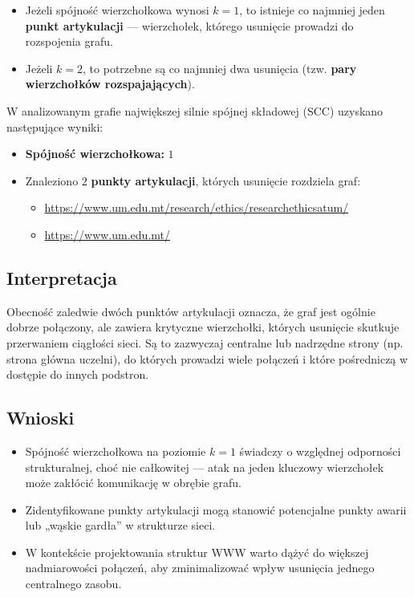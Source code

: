 \begin{itemize}
    \item Jeżeli spójność wierzchołkowa wynosi $k = 1$, to istnieje co najmniej jeden \textbf{punkt artykulacji} — wierzchołek, którego usunięcie prowadzi do rozspojenia grafu.
    \item Jeżeli $k = 2$, to potrzebne są co najmniej dwa usunięcia (tzw. \textbf{pary wierzchołków rozspajających}).
\end{itemize}

W analizowanym grafie największej silnie spójnej składowej (SCC) uzyskano następujące wyniki:

\begin{itemize}
    \item \textbf{Spójność wierzchołkowa:} $1$
    \item Znaleziono $2$ \textbf{punkty artykulacji}, których usunięcie rozdziela graf:
    \begin{itemize}
        \item \url{https://www.um.edu.mt/research/ethics/researchethicsatum/}
        \item \url{https://www.um.edu.mt/}
    \end{itemize}
\end{itemize}

\subsection{Interpretacja}

Obecność zaledwie dwóch punktów artykulacji oznacza, że graf jest ogólnie dobrze połączony, ale zawiera krytyczne wierzchołki, których usunięcie skutkuje przerwaniem ciągłości sieci. Są to zazwyczaj centralne lub nadrzędne strony (np. strona główna uczelni), do których prowadzi wiele połączeń i które pośredniczą w dostępie do innych podstron.

\subsection{Wnioski}

\begin{itemize}
    \item Spójność wierzchołkowa na poziomie $k = 1$ świadczy o względnej odporności strukturalnej, choć nie całkowitej — atak na jeden kluczowy wierzchołek może zakłócić komunikację w obrębie grafu.
    \item Zidentyfikowane punkty artykulacji mogą stanowić potencjalne punkty awarii lub „wąskie gardła” w strukturze sieci.
    \item W kontekście projektowania struktur WWW warto dążyć do większej nadmiarowości połączeń, aby zminimalizować wpływ usunięcia jednego centralnego zasobu.
\end{itemize}

